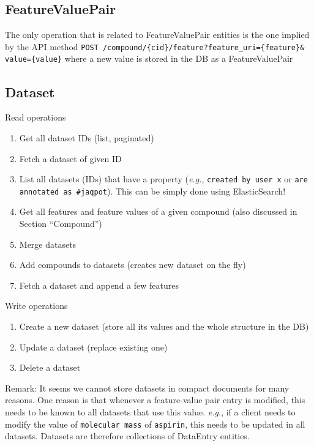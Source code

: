 \subsection{FeatureValuePair}

The only operation that is related to FeatureValuePair entities is the one implied by the API method 
\texttt{POST /compound/\{cid\}/feature?feature\_uri=\{feature\}\& value=\{value\}} 
where a new value is stored in the DB as a FeatureValuePair

\subsection{Dataset}

\noindent Read operations
\begin{enumerate}
 \item Get all dataset IDs (list, paginated)
\item  Fetch a dataset of given ID
\item  List all datasets (IDs) that have a property (\textit{e.g.}, 
   \texttt{created by user x} or \texttt{are annotated as \#jaqpot}). This can be simply done using ElasticSearch!
\item  Get all features and feature values of a given compound (also discussed in Section “Compound”)
\item  Merge datasets
\item  Add compounds to datasets (creates new dataset on the fly)
\item  Fetch a dataset and append a few features
\end{enumerate}


\noindent Write operations
\begin{enumerate}
\item  Create a new dataset (store all its values and the whole structure in the DB)
\item  Update a dataset (replace existing one)
\item Delete a dataset
\end{enumerate}

\noindent Remark: It seems we cannot store datasets in compact documents for many reasons. 
One reason is that whenever a feature-value pair entry is modified, this needs to be known to 
all datasets that use this value. \textit{e.g.}, if a client needs to modify the value of \texttt{molecular mass}
of \texttt{aspirin}, this needs to be updated in all datasets. 
Datasets are therefore collections of DataEntry entities.





